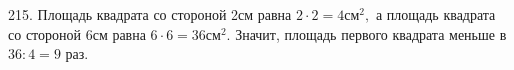 215. Площадь квадрата со стороной 2см равна $2\cdot2=4\text{см}^2,$ а площадь квадрата со стороной 6см равна $6\cdot6=36\text{см}^2.$ Значит, площадь первого квадрата меньше в $36:4=9$ раз.\\
